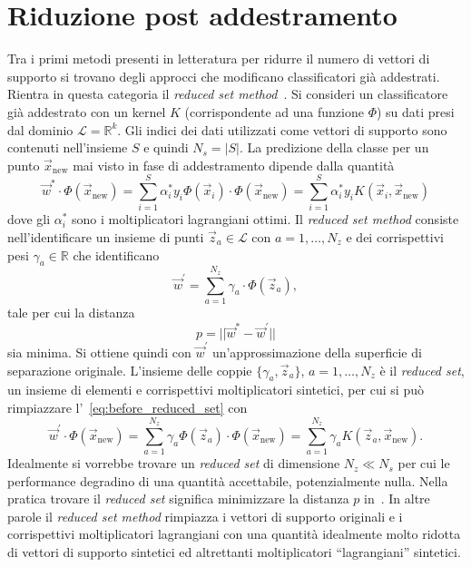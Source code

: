 \section{Riduzione post addestramento}\label{sec:sparsesvm:post_processing}
Tra i primi metodi presenti in letteratura per ridurre il numero di vettori di supporto si trovano degli approcci che modificano classificatori già addestrati. 
Rientra in questa categoria il \emph{reduced set method}~\cite{reduced_set_method}.
Si consideri un classificatore già addestrato con un kernel $K$ (corrispondente ad una funzione $\Phi$) su dati presi dal dominio $\mathcal{L}=\mathbb{R}^k$. Gli indici dei dati utilizzati come vettori di supporto sono contenuti nell'insieme $S$ e quindi $N_s=|S|$. 
La predizione della classe per un punto $\Vec{x}_\text{new}$ mai visto in fase di addestramento dipende dalla quantità
\begin{equation}\label{eq:before_reduced_set}
\Vec{w}^*\cdot\Phi(\Vec{x}_\text{new}) = \sum_{i=1}^{S} \alpha^*_iy_i\Phi(\Vec{x}_i) \cdot \Phi(\Vec{x}_\text{new}) = \sum_{i=1}^{S} \alpha^*_iy_iK(\Vec{x}_i, \Vec{x}_\text{new})
\end{equation}
dove gli $\alpha^*_i$ sono i moltiplicatori lagrangiani ottimi. 
Il \emph{reduced set method} consiste nell'identificare un insieme di punti $\Vec{z}_a \in \mathcal{L}$ con $a=1,\dots,N_z$ e dei corrispettivi pesi $\gamma_a \in \mathbb{R}$ che identificano 
\begin{equation*}
    \Vec{w}^{'} = \sum_{a=1}^{N_z}\gamma_a\cdot\Phi(\Vec{z}_a),
\end{equation*} 
tale per cui la distanza 
\begin{equation}\label{eq:reduced_set_p_distance}
    p = ||\Vec{w}^*-\Vec{w}^{'}||
\end{equation} 
sia minima. Si ottiene quindi con $\Vec{w}^{'}$ un'approssimazione della superficie di separazione originale.
L'insieme delle coppie $\{\gamma_a, \Vec{z}_a\}$, $a=1,\dots, N_z$ è il \emph{reduced set}, un insieme di elementi e corrispettivi moltiplicatori sintetici, per cui si può rimpiazzare l'~\cref{eq:before_reduced_set} con 
\begin{equation}\label{eq:reduced_set}
\Vec{w}^{'} \cdot \Phi(\Vec{x}_\text{new}) = \sum_{a=1}^{N_z}\gamma_a \Phi(\Vec{z}_a) \cdot \Phi(\Vec{x}_\text{new}) = \sum_{a=1}^{N_z}\gamma_a K(\Vec{z}_a, \Vec{x}_\text{new}).
\end{equation}
Idealmente si vorrebbe trovare un \emph{reduced set} di dimensione $N_z \ll N_s$ per cui le performance degradino di una quantità accettabile, potenzialmente nulla.
Nella pratica trovare il \emph{reduced set} significa minimizzare la distanza $p$ in~. 
In altre parole il \emph{reduced set method} rimpiazza i vettori di supporto originali e i corrispettivi moltiplicatori lagrangiani con una quantità idealmente molto ridotta di vettori di supporto sintetici ed altrettanti moltiplicatori ``lagrangiani'' sintetici. 

